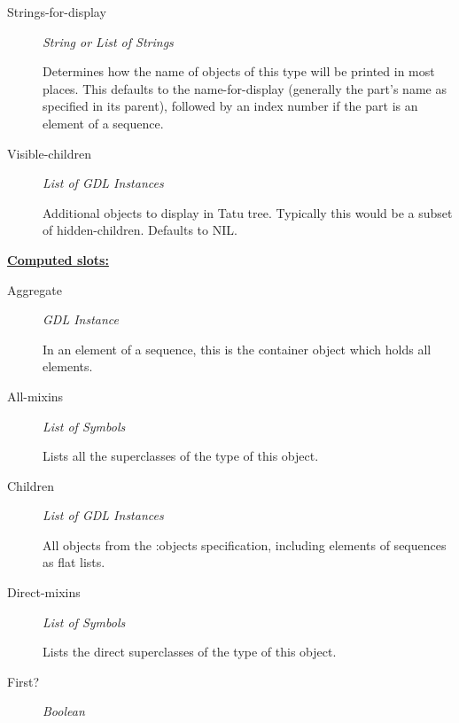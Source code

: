 \documentclass [11pt]{book}
\begin{document}
\begin{itemize}
\begin{description}
\item [Strings-for-display]
\emph{String or List of Strings}

 Determines how the name of objects of
this type will be printed in most places.  This defaults to the
name-for-display (generally the part's name as specified in its
parent), followed by an index number if the part is an element of a
sequence.




\item [Visible-children]
\emph{List of GDL Instances}

 Additional objects to display in Tatu
tree. Typically this would be a subset of
hidden-children. Defaults to NIL.




\end{description}






\textbf{
\underline{Computed slots:}}

\begin{description}

\item [Aggregate]
\emph{GDL Instance}

 In an element of a sequence, this is the container object which holds all elements.




\item [All-mixins]
\emph{List of Symbols}

 Lists all the superclasses of the type of this object.




\item [Children]
\emph{List of GDL Instances}

 All objects from the :objects specification, including elements of sequences
as flat lists.




\item [Direct-mixins]
\emph{List of Symbols}

 Lists the direct superclasses of the type of this object.




\item [First?]
\emph{Boolean}


\end{description}
\end{itemize}
\end{document}
